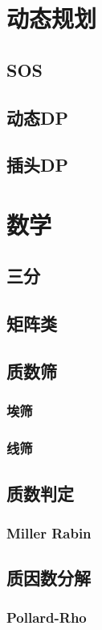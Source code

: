 \documentclass[twocolumn,a4]{article}
\newcommand{\addcpp}[1]{}
\begin{document}
\section{动态规划}
	\subsection{SOS}
		\addcpp{dp/SOS}
	\subsection{动态DP}
	\subsection{插头DP}

\section{数学}
	\subsection{三分}
		\addcpp{math/tripartition}
	\subsection{矩阵类}
	\subsection{质数筛}
		\subsubsection{埃筛}
		\subsubsection{线筛}
	\subsection{质数判定}
		\subsubsection{Miller Rabin}
			\addcpp{math/Miller-Rabin}
	\subsection{质因数分解}
		\subsubsection{Pollard-Rho}
			\addcpp{math/Pollard-rho}
\end{document}
